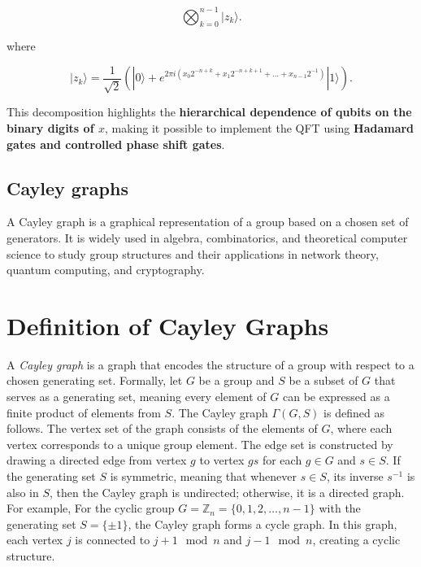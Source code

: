 \documentclass[11pt]{article}
\theoremstyle{definition}
\begin{document}
\[
\bigotimes_{k=0}^{n-1} | z_k \rangle.
\]

where

\[
| z_k \rangle = \frac{1}{\sqrt{2}} ( | 0 \rangle + e^{2\pi i ( x_0 2^{-n+k} + x_1 2^{-n+k+1} + \dots + x_{n-1} 2^{-1} )} | 1 \rangle ).
\]

This decomposition highlights the \textbf{hierarchical dependence of qubits on the binary digits of \( x \)}, making it possible to implement the QFT using \textbf{Hadamard gates and controlled phase shift gates}.


\subsection*{Cayley graphs}

A Cayley graph is a graphical representation of a group based on a chosen set of generators. It is widely used in algebra, combinatorics, and theoretical computer science to study group structures and their applications in network theory, quantum computing, and cryptography.


\section*{Definition of Cayley Graphs}

A \textit{Cayley graph} is a graph that encodes the structure of a group with respect to a chosen generating set. Formally, let \( G \) be a group and \( S \) be a subset of \( G \) that serves as a generating set, meaning every element of \( G \) can be expressed as a finite product of elements from \( S \). The Cayley graph \( \Gamma(G, S) \) is defined as follows. The vertex set of the graph consists of the elements of \( G \), where each vertex corresponds to a unique group element. The edge set is constructed by drawing a directed edge from vertex \( g \) to vertex \( gs \) for each \( g \in G \) and \( s \in S \). If the generating set \( S \) is symmetric, meaning that whenever \( s \in S \), its inverse \( s^{-1} \) is also in \( S \), then the Cayley graph is undirected; otherwise, it is a directed graph.
For example, For the cyclic group \( G = \mathbb{Z}_n = \{0,1,2,\dots, n-1\} \) with the generating set \( S = \{\pm 1\} \), the Cayley graph forms a cycle graph. In this graph, each vertex \( j \) is connected to \( j+1 \mod n \) and \( j-1 \mod n \), creating a cyclic structure.
\end{document}
